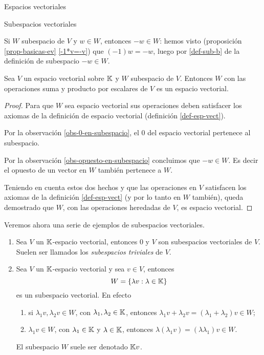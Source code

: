 \begin{chapter}{Espacios vectoriales}
\begin{section}{Subespacios vectoriales}
    \begin{observacion}\label{obs-opuesto-en-subespacio} Si $W$ subespacio de $V$ y $w \in W$,  entonces $-w \in W$: hemos visto (proposición \ref{prop-basicas-ev} \ref{-1*v=-v}) que  $(-1)w=-w $, luego por \ref{def-sub-b} de la definición de subespacio $-w \in W$.
    \end{observacion}

    \begin{teorema}
        Sea $V$ un espacio vectorial sobre $\mathbb K$ y $W$ subespacio de $V$. Entonces $W$ con las operaciones suma y producto por escalares de $V$ es un espacio vectorial.
    \end{teorema}
    \begin{proof} 
        Para que $W$ sea espacio vectorial sus operaciones deben satisfacer los axiomas de la definición de espacio vectorial (definición \ref{def-esp-vect}). 
        
        Por la observación \ref{obs-0-en-subespacio}, el $0$ del espacio vectorial pertenece al subespacio. 
        
       Por la observación  \ref{obs-opuesto-en-subespacio} concluimos que $-w\in W$. Es decir el opuesto de un vector en $W$ también pertenece a $W$. 
        
        Teniendo en cuenta estos dos hechos y que las operaciones en $V$ satisfacen los axiomas de la definición \ref{def-esp-vect} (y por lo tanto en $W$ también),  queda demostrado que $W$, con las operaciones heredadas de $V$, es espacio vectorial.  
    \end{proof}



\begin{ejemplo*} Veremos ahora una serie de ejemplos de subespacios vectoriales.
    \begin{enumerate}
        \item Sea $V$ un $\mathbb K$-espacio vectorial, entonces $0$ y $V$ son subespacios vectoriales de $V$. Suelen ser llamados los \textit{subespacios triviales} de $V$.
        
        \item Sea $V$ un $\mathbb K$-espacio vectorial y sea $v \in V$, entonces
        $$
        W = \{\lambda v: \lambda \in \mathbb K \}
        $$
        es un subespacio vectorial. En  efecto
        \begin{enumerate}
            \item si $\lambda_1v,\lambda_2v \in W$, con $\lambda_1,\lambda_2 \in \mathbb K$,  entonces $\lambda_1v + \lambda_2v = (\lambda_1+\lambda_2)v \in W$;
            \item  $\lambda_1v \in W$, con $\lambda_1 \in \mathbb K$ y $\lambda \in \mathbb K$,  entonces $\lambda(\lambda_1v) = (\lambda \lambda_1)v \in W$.
        \end{enumerate}
        El subespacio $W$ suele ser denotado $\mathbb K v$.
    

\end{enumerate}
\end{ejemplo*}
\end{section}
\end{chapter}
